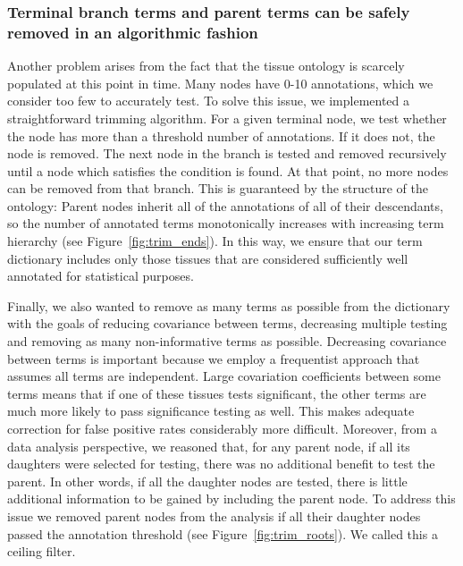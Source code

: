 \documentclass{bmcart}
\begin{document}
\subsubsection*{Terminal branch terms and parent terms can be safely removed in an algorithmic fashion }
Another problem arises from the fact that the tissue ontology is scarcely populated at this point in time. Many nodes have 0-10 annotations, which we consider too few to accurately test. To solve this issue, we implemented a
straightforward trimming algorithm. For a given terminal node, we test whether the node has more than a threshold number of annotations. If it does not, the node is removed. The next node in the branch is tested and removed recursively until a node which satisfies the condition is found. At that point, no more nodes can be removed from that branch. This is guaranteed by the structure of the ontology: Parent nodes inherit all of the annotations of all of their descendants, so the number of annotated terms monotonically increases with increasing term hierarchy (see Figure~\ref{fig:trim_ends}). In this way, we ensure that our term dictionary includes only those tissues that are considered sufficiently well annotated for statistical purposes.

Finally, we also wanted to remove as many terms as possible from the dictionary with the goals of reducing covariance between terms, decreasing multiple testing and removing as many non-informative terms as possible. Decreasing covariance between terms is important because we employ a frequentist approach that assumes all terms are independent. Large covariation coefficients between some terms means that if one of these tissues tests significant, the other terms are much more likely to pass significance testing as well. This makes adequate correction for false positive rates considerably more difficult. Moreover, from a data analysis perspective, we reasoned that, for any parent node, if all its daughters were selected for testing, there was no additional benefit to test the parent. In other words, if all the daughter nodes are tested, there is little additional information to be gained by including the parent node. To address this issue we removed parent nodes from the analysis if all their daughter nodes passed the annotation threshold (see Figure~\ref{fig:trim_roots}). We called this a ceiling filter.
\end{document}
